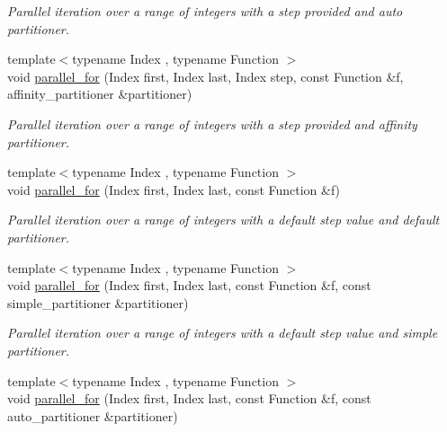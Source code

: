 \begin{DoxyCompactItemize}
\begin{DoxyCompactList}\small\item\em Parallel iteration over a range of integers with a step provided and auto partitioner. \end{DoxyCompactList}\item 
\hypertarget{namespacetbb_1_1strict__ppl_a815e6bd1b8a9edb87ed2ad0ebfcfe584}{}{\footnotesize template$<$typename Index , typename Function $>$ }\\void \hyperlink{namespacetbb_1_1strict__ppl_a815e6bd1b8a9edb87ed2ad0ebfcfe584}{parallel\+\_\+for} (Index first, Index last, Index step, const Function \&f, affinity\+\_\+partitioner \&partitioner)\label{namespacetbb_1_1strict__ppl_a815e6bd1b8a9edb87ed2ad0ebfcfe584}

\begin{DoxyCompactList}\small\item\em Parallel iteration over a range of integers with a step provided and affinity partitioner. \end{DoxyCompactList}\item 
\hypertarget{namespacetbb_1_1strict__ppl_ab5cd9a588cde788390bb8e01956ba7e9}{}{\footnotesize template$<$typename Index , typename Function $>$ }\\void \hyperlink{namespacetbb_1_1strict__ppl_ab5cd9a588cde788390bb8e01956ba7e9}{parallel\+\_\+for} (Index first, Index last, const Function \&f)\label{namespacetbb_1_1strict__ppl_ab5cd9a588cde788390bb8e01956ba7e9}

\begin{DoxyCompactList}\small\item\em Parallel iteration over a range of integers with a default step value and default partitioner. \end{DoxyCompactList}\item 
\hypertarget{namespacetbb_1_1strict__ppl_a17c4010a76f6576b41b7e166b8de3a33}{}{\footnotesize template$<$typename Index , typename Function $>$ }\\void \hyperlink{namespacetbb_1_1strict__ppl_a17c4010a76f6576b41b7e166b8de3a33}{parallel\+\_\+for} (Index first, Index last, const Function \&f, const simple\+\_\+partitioner \&partitioner)\label{namespacetbb_1_1strict__ppl_a17c4010a76f6576b41b7e166b8de3a33}

\begin{DoxyCompactList}\small\item\em Parallel iteration over a range of integers with a default step value and simple partitioner. \end{DoxyCompactList}\item 
\hypertarget{namespacetbb_1_1strict__ppl_a46eb046f06d73372f427c5cd6f7395f4}{}{\footnotesize template$<$typename Index , typename Function $>$ }\\void \hyperlink{namespacetbb_1_1strict__ppl_a46eb046f06d73372f427c5cd6f7395f4}{parallel\+\_\+for} (Index first, Index last, const Function \&f, const auto\+\_\+partitioner \&partitioner)\label{namespacetbb_1_1strict__ppl_a46eb046f06d73372f427c5cd6f7395f4}


\end{DoxyCompactItemize}
